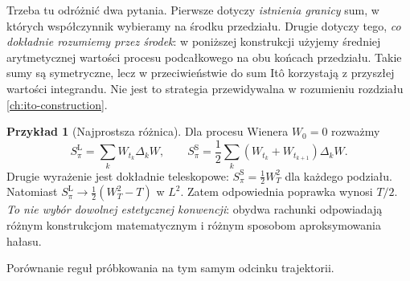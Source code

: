 \documentclass[11pt,a4paper,oneside]{report}
\numberwithin{equation}{chapter}
\theoremstyle{plain}
\theoremstyle{definition}
\newtheorem{przyklad}{Przykład}[chapter]
\theoremstyle{remark}
\begin{document}
Trzeba tu odróżnić dwa pytania. Pierwsze dotyczy
\emph{istnienia granicy} sum, w których współczynnik
wybieramy na środku przedziału. Drugie dotyczy tego,
\emph{co dokładnie rozumiemy przez środek}: w poniższej
konstrukcji użyjemy średniej arytmetycznej wartości
procesu podcałkowego na obu końcach przedziału.
Takie sumy są symetryczne, lecz w przeciwieństwie do
sum Itô korzystają z przyszłej wartości integrandu.
Nie jest to strategia przewidywalna w rozumieniu
rozdziału \ref{ch:ito-construction}.

\begin{przyklad}[Najprostsza różnica]
Dla procesu Wienera $W_0=0$ rozważmy
\[
S_\pi^{\mathrm L}=\sum_kW_{t_k}\Delta_kW,
\qquad
S_\pi^{\mathrm S}=
\frac12\sum_k(W_{t_k}+W_{t_{k+1}})\Delta_kW.
\]
Drugie wyrażenie jest dokładnie teleskopowe:
$S_\pi^{\mathrm S}=\frac12W_T^2$ dla każdego podziału.
Natomiast $S_\pi^{\mathrm L}\to\frac12(W_T^2-T)$
w $L^2$. Zatem odpowiednia poprawka wynosi $T/2$.
\emph{To nie wybór dowolnej estetycznej konwencji}:
obydwa rachunki odpowiadają różnym konstrukcjom
matematycznym i różnym sposobom aproksymowania hałasu.
\end{przyklad}

\begin{center}
\par\smallskip\small Porównanie reguł próbkowania na tym samym odcinku trajektorii.
\end{center}


\end{document}
